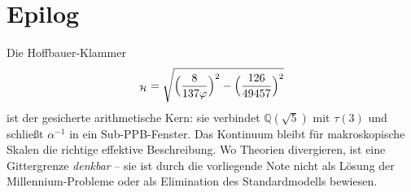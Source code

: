 \documentclass[11pt,a4paper]{article}
\theoremstyle{definition}
\theoremstyle{remark}
\numberwithin{equation}{section}
\begin{document}
\section{Epilog}

Die Hoffbauer-Klammer
\begin{equation}
[D_r,D_t]_{\mathcal{H}}
=\sqrt{\Bigl(\frac{8}{137\varphi}\Bigr)^2-\Bigl(\frac{126}{49457}\Bigr)^2}
\end{equation}
ist der gesicherte arithmetische Kern:
sie verbindet $\mathbb{Q}(\sqrt{5})$ mit $\tau(3)$ und schließt $\alpha^{-1}$ in ein Sub-PPB-Fenster.
Das Kontinuum bleibt für makroskopische Skalen die richtige effektive Beschreibung.
Wo Theorien divergieren, ist eine Gittergrenze \emph{denkbar} -- sie ist durch die vorliegende Note nicht als Lösung der Millennium-Probleme oder als Elimination des Standardmodells bewiesen.
\end{document}
